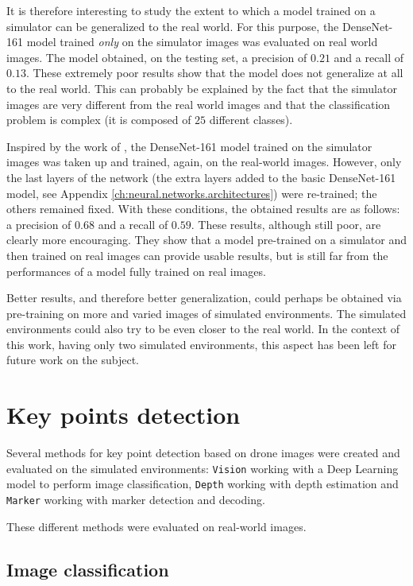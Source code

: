 It is therefore interesting to study the extent to which a model trained on a simulator can be generalized to the real world. For this purpose, the DenseNet-161 model trained \emph{only} on the simulator images was evaluated on real world images. The model obtained, on the testing set, a precision of $\num{0.21}$ and a recall of $\num{0.13}$. These extremely poor results show that the model does not generalize at all to the real world. This can probably be explained by the fact that the simulator images are very different from the real world images and that the classification problem is complex (it is composed of $\num{25}$ different classes).

Inspired by the work of \textcite{anwar2020autonomous}, the DenseNet-161 model trained on the simulator images was taken up and trained, again, on the real-world images. However, only the last layers of the network (the extra layers added to the basic DenseNet-161 model, see Appendix \ref{ch:neural.networks.architectures}) were re-trained; the others remained fixed. With these conditions, the obtained results are as follows: a precision of $\num{0.68}$ and a recall of $\num{0.59}$. These results, although still poor, are clearly more encouraging. They show that a model pre-trained on a simulator and then trained on real images can provide usable results, but is still far from the performances of a model fully trained on real images.

Better results, and therefore better generalization, could perhaps be obtained via pre-training on more and varied images of simulated environments. The simulated environments could also try to be even closer to the real world. In the context of this work, having only two simulated environments, this aspect has been left for future work on the subject.

\section{Key points detection}

Several methods for key point detection based on drone images were created and evaluated on the simulated environments: \texttt{Vision} working with a Deep Learning model to perform image classification, \texttt{Depth} working with depth estimation and \texttt{Marker} working with marker detection and decoding.

These different methods were evaluated on real-world images.

\subsection{Image classification}

